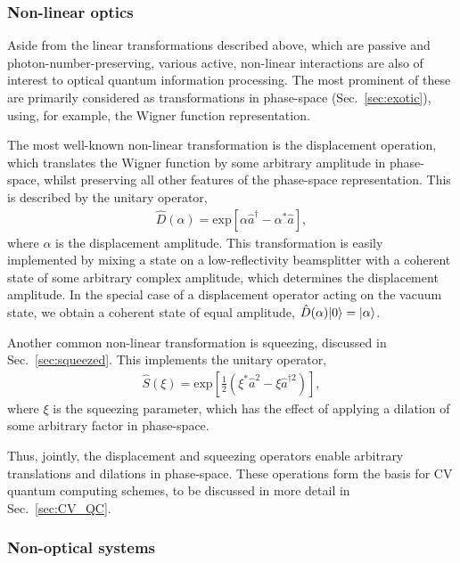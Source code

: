 %
%

\subsubsection{Non-linear optics} \label{sec:non_lin_opt} 

Aside from the linear transformations described above, which are passive and photon-number-preserving, various active, non-linear interactions are also of interest to optical quantum information processing. The most prominent of these are primarily considered as transformations in phase-space (Sec.~\ref{sec:exotic}), using, for example, the Wigner function representation.

The most well-known non-linear transformation is the displacement operation, which translates the Wigner function by some arbitrary amplitude in phase-space, whilst preserving all other features of the phase-space representation. This is described by the unitary operator,
\begin{align}
\hat{D}(\alpha) = \text{exp}\left[\alpha\hat{a}^\dag - \alpha^*\hat{a}\right],
\end{align}
where $\alpha$ is the displacement amplitude. This transformation is easily implemented by mixing a state on a low-reflectivity beamsplitter with a coherent state of some arbitrary complex amplitude, which determines the displacement amplitude. In the special case of a displacement operator acting on the vacuum state, we obtain a coherent state of equal amplitude, \mbox{$\hat{D}(\alpha)|0\rangle=|\alpha\rangle$}.

Another common non-linear transformation is squeezing, discussed in Sec.~\ref{sec:squeezed}. This implements the unitary operator,
\begin{align}
\hat{S}(\xi) = \text{exp}\left[ \frac{1}{2}(\xi^*\hat{a}^2 - \xi{\hat{a}^{\dag 2}})\right],
\end{align}
where $\xi$ is the squeezing parameter, which has the effect of applying a dilation of some arbitrary factor in phase-space.

Thus, jointly, the displacement and squeezing operators enable arbitrary translations and dilations in phase-space. These operations form the basis for CV quantum computing schemes, to be discussed in more detail in Sec.~\ref{sec:CV_QC}.

%
%

\subsubsection{Non-optical systems}

